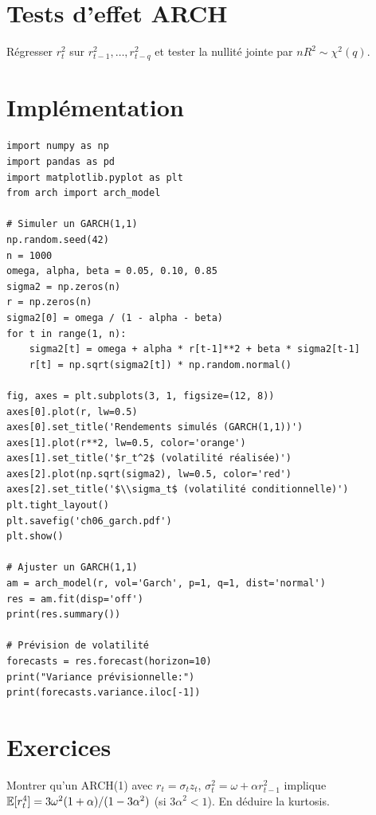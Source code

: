 \section{Tests d'effet ARCH}

\begin{definition}
R\'egresser $r_t^2$ sur $r_{t-1}^2,\ldots,r_{t-q}^2$ et tester la nullit\'e jointe par $nR^2\sim\chi^2(q)$.
\end{definition}

\section{Impl\'ementation}

\begin{codeblock}[title=\textbf{Python}]
\begin{verbatim}
import numpy as np
import pandas as pd
import matplotlib.pyplot as plt
from arch import arch_model

# Simuler un GARCH(1,1)
np.random.seed(42)
n = 1000
omega, alpha, beta = 0.05, 0.10, 0.85
sigma2 = np.zeros(n)
r = np.zeros(n)
sigma2[0] = omega / (1 - alpha - beta)
for t in range(1, n):
    sigma2[t] = omega + alpha * r[t-1]**2 + beta * sigma2[t-1]
    r[t] = np.sqrt(sigma2[t]) * np.random.normal()

fig, axes = plt.subplots(3, 1, figsize=(12, 8))
axes[0].plot(r, lw=0.5)
axes[0].set_title('Rendements simulés (GARCH(1,1))')
axes[1].plot(r**2, lw=0.5, color='orange')
axes[1].set_title('$r_t^2$ (volatilité réalisée)')
axes[2].plot(np.sqrt(sigma2), lw=0.5, color='red')
axes[2].set_title('$\\sigma_t$ (volatilité conditionnelle)')
plt.tight_layout()
plt.savefig('ch06_garch.pdf')
plt.show()

# Ajuster un GARCH(1,1)
am = arch_model(r, vol='Garch', p=1, q=1, dist='normal')
res = am.fit(disp='off')
print(res.summary())

# Prévision de volatilité
forecasts = res.forecast(horizon=10)
print("Variance prévisionnelle:")
print(forecasts.variance.iloc[-1])
\end{verbatim}
\end{codeblock}

\section{Exercices}

\begin{exercice}[$\star$]
Montrer qu'un ARCH(1) avec $r_t=\sigma_t z_t$, $\sigma_t^2=\omega+\alpha r_{t-1}^2$ implique $\mathbb{E}[r_t^4]=3\omega^2(1+\alpha)/(1-3\alpha^2)$ (si $3\alpha^2<1$). En d\'eduire la kurtosis.
\end{exercice}


